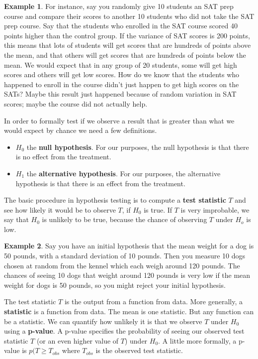 \documentclass[]{article}
\theoremstyle{definition}
\newtheorem{exmp}{Example}[section]
\begin{document}
\begin{exmp}
For instance, say you randomly give 10 students an SAT prep course and compare their scores to another 10 students who did not take the SAT prep course. Say that the students who enrolled in the SAT course scored 40 points higher than the control group. If the variance of SAT scores is 200 points, this means that lots of students will get scores that are hundreds of points above the mean, and that others will get scores that are hundreds of points below the mean. We would expect that in any group of 20 students, some will get high scores and others will get low scores. How do we know that the students who happened to enroll in the course didn't just happen to get high scores on the SATs? Maybe this result just happened because of random variation in SAT scores; maybe the course did not actually help.
\end{exmp}

In order to formally test if we observe a result that is greater than what we would expect by chance we need a few definitions. 

\begin{itemize}
\item $H_0$ the \textbf{null hypothesis}. For our purposes, the null hypothesis is that there is no effect from the treatment.
\item $H_1$ the \textbf{alternative hypothesis}. For our purposes, the alternative hypothesis is that there is an effect from the treatment.
\end{itemize}

The basic procedure in hypothesis testing is to compute a \textbf{test statistic} $T$ and see how likely it would be to observe $T$, if $H_0$ is true. If $T$ is very improbable, we say that $H_0$ is unlikely to be true, because the chance of observing $T$ under $H_o$ is low. 

\begin{exmp}
Say you have an initial hypothesis that the mean weight for a dog is 50 pounds, with a standard deviation of 10 pounds. Then you measure 10 dogs chosen at random from the kennel which each weigh around 120 pounds. The chances of seeing 10 dogs that weight around 120 pounds is very low if the mean weight for dogs is 50 pounds, so you might reject your initial hypothesis.
\end{exmp}

\noindent The test statistic $T$ is the output from a function from data. More generally, a \textbf{statistic} is a function from data. The mean is one statistic. But any function can be a statistic. We can quantify how unlikely it is that we observe $T$ under $H_0$ using a \textbf{p-value}. A p-value specifies the probability of seeing our observed test statistic $T$ (or an even higher value of $T$) under $H_0$. A little more formally, a p-value is $p(T \geq T_{obs}$ where $T_{obs}$ is the observed test statistic.
\end{document}
